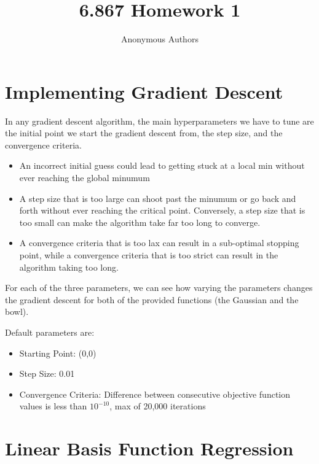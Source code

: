 \documentclass[journal]{IEEEtran}
\title{6.867 Homework 1}
\author{Anonymous Authors}
\begin{document}
\maketitle
\thispagestyle{fancy}

\section{Implementing Gradient Descent}


In any gradient descent algorithm, the main hyperparameters we have to tune are the initial point we start the gradient descent from, the step size, and the convergence criteria. 

\begin{itemize}

\item An incorrect initial guess could lead to getting stuck at a local min without ever reaching the global minumum
\item A step size that is too large can shoot past the minumum or go back and forth without ever reaching the critical point. Conversely, a step size that is too small can make the algorithm take far too long to converge.
\item A convergence criteria that is too lax can result in a sub-optimal stopping point, while a convergence criteria that is too strict can result in the algorithm taking too long.

\end{itemize}

For each of the three parameters, we can see how varying the parameters changes the gradient descent for both of the provided functions (the Gaussian and the bowl).

Default parameters are: 

\begin{itemize}

\item Starting Point: (0,0)
\item Step Size: 0.01
\item Convergence Criteria: Difference between consecutive objective function values is less than $10^{-10}$, max of 20,000 iterations

\end{itemize}

\section{Linear Basis Function Regression}
\end{document}
